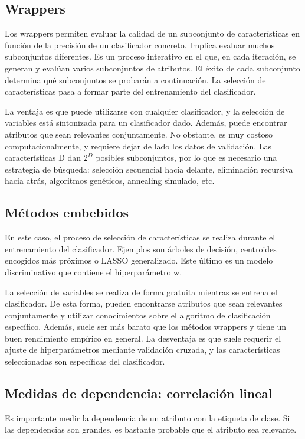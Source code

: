 \subsection{Wrappers}
Los wrappers permiten evaluar la calidad de un subconjunto de características en función de la precisión de un clasificador concreto. Implica evaluar muchos subconjuntos diferentes. Es un proceso interativo en el que, en cada iteración, se generan y evalúan varios subconjuntos de atributos. El éxito de cada subconjunto determina qué subconjuntos se probarán a continuación. La selección de características pasa a formar parte del entrenamiento del clasificador.

La ventaja es que puede utilizarse con cualquier clasificador, y la selección de variables está sintonizada para un clasificador dado. Además, puede encontrar atributos que sean relevantes conjuntamente. No obstante, es muy costoso computacionalmente, y requiere dejar de lado los datos de validación.
Las características D dan $2^D$ posibles subconjuntos, por lo que es necesario una estrategia de búsqueda: selección secuencial hacia delante, eliminación recursiva hacia atrás, algoritmos genéticos, annealing simulado, etc.

\subsection{Métodos embebidos}
En este caso, el proceso de selección de características se realiza durante el entrenamiento del clasificador. Ejemplos son árboles de decisión, centroides encogidos más próximos o LASSO generalizado. Este último es un modelo discriminativo que contiene el hiperparámetro w. 

La selección de variables se realiza de forma gratuita mientras se entrena el clasificador. De esta forma, pueden encontrarse atributos que sean relevantes conjuntamente y utilizar conocimientos sobre el algoritmo de clasificación específico. Además, suele ser más barato que los métodos wrappers y tiene un buen rendimiento empírico en general. La desventaja es que suele requerir el ajuste de hiperparámetros mediante validación cruzada, y las características seleccionadas son específicas del clasificador. 

\subsection{Medidas de dependencia: correlación lineal}
Es importante medir la dependencia de un atributo con la etiqueta de clase. Si las dependencias son grandes, es bastante probable que el atributo sea relevante. 

